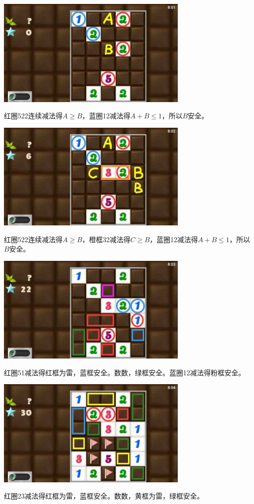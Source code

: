 \subsection{} %
\begin{center}
    \includegraphics[width=0.7\textwidth]{puzzlelow/219-1.jpg}
\end{center}
红圈522连续减法得$A\ge B$，蓝圈12减法得$A+B\le 1$，所以$B$安全。
\begin{center}
    \includegraphics[width=0.7\textwidth]{puzzlelow/219-2.jpg}
\end{center}
红圈522连续减法得$A\ge B$，橙框32减法得$C\ge B$，蓝圈12减法得$A+B\le 1$，所以$B$安全。
\begin{center}
    \includegraphics[width=0.7\textwidth]{puzzlelow/219-3.jpg}
\end{center}
红圈51减法得红框为雷，蓝框安全。数数，绿框安全。蓝圈12减法得粉框安全。
\begin{center}
    \includegraphics[width=0.7\textwidth]{puzzlelow/219-4.jpg}
\end{center}
红圈23减法得红框为雷，蓝框安全。数数，黄框为雷，绿框安全。

